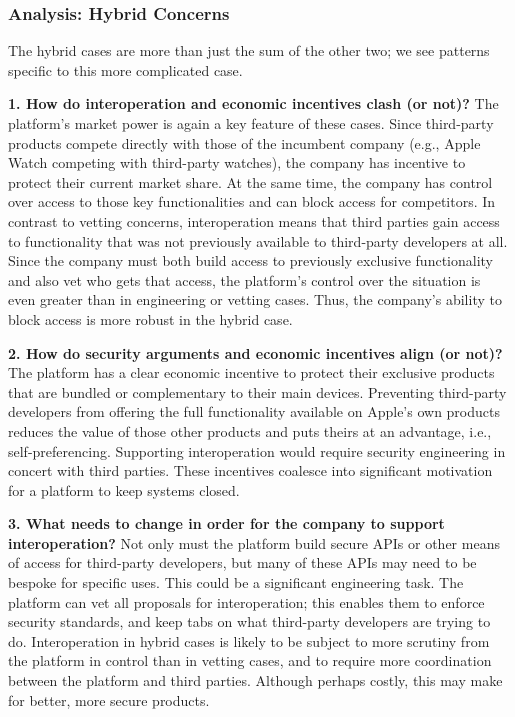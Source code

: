 \documentclass[letterpaper,twocolumn,10pt]{article}
\newcommand{\qone}{How do interoperation and economic incentives clash
(or not)?\xspace}
\newcommand{\qtwo}{How do security arguments and economic incentives align (or not)?\xspace}
\newcommand{\qthree}{What needs to change in order for the company to support interoperation?\xspace}
\newcommand{\question}[1]{\smallskip \noindent \textbf{{#1}}}
\begin{document}

\subsubsection{Analysis: Hybrid Concerns}
The hybrid cases are more than just the sum of the other two; we see patterns specific to this more complicated case.  

\question{1. \qone}
The platform's market power is again a key feature of these cases. Since third-party products compete directly with those of the incumbent company (e.g., Apple Watch competing with third-party watches), the company has incentive to protect their current market share.
At the same time, the company has control over access to those key functionalities and can block access for competitors.
In contrast to vetting concerns, interoperation means that third parties gain access to functionality that was not previously available to third-party developers at all.  
Since the company must both build access to previously exclusive functionality and also vet who gets that access, the platform's control over the situation is even greater than in engineering or vetting cases.  Thus, the company's ability to block access is more robust in the hybrid case.

\question{2. \qtwo} The platform has a clear economic incentive to protect their exclusive products that are bundled or complementary to their main devices. Preventing third-party developers from offering the full functionality available on Apple's own products reduces the  value of those other products and puts theirs at an advantage, i.e., self-preferencing. Supporting interoperation would require security engineering in concert with third parties.  These incentives coalesce into significant motivation for a platform to keep systems closed. 

\question{3. \qthree} 
 Not only must the platform build secure APIs or other means of access for third-party developers, but many of these APIs may need to be bespoke for specific uses. This could be a significant engineering task. The platform can vet all proposals for interoperation; this enables them to enforce security standards, and  keep tabs on what third-party developers are trying to do. Interoperation in hybrid cases is likely to be subject to more scrutiny from the platform in control than in vetting cases, and to require more coordination between the platform and third parties. Although perhaps costly, this may make for better, more secure products.
\end{document}
